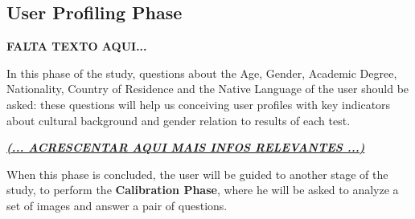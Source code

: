 \subsection{User Profiling Phase}
\label{subsec:design_profiling}
%
\textbf{FALTA TEXTO AQUI...} \par
%
In this phase of the study, questions about the Age, Gender, Academic Degree, Nationality, Country of Residence and the Native Language of the user should be asked: these questions will help us conceiving user profiles with key indicators about cultural background and gender relation to results of each test. \par
%
\textbf{\underline{\emph{(... ACRESCENTAR AQUI MAIS INFOS RELEVANTES ...)}}} \par
%
When this phase is concluded, the user will be guided to another stage of the study, to perform the \textbf{Calibration Phase}, where he will be asked to analyze a set of images and answer a pair of questions. \par
%

